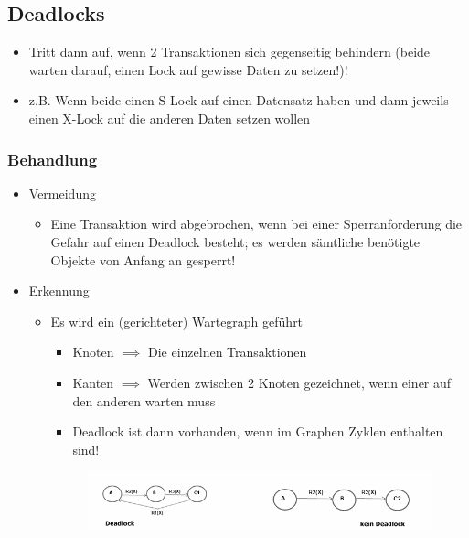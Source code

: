 \subsection{Deadlocks}
\begin{itemize}
    \item Tritt dann auf, wenn 2 Transaktionen sich gegenseitig behindern (beide warten darauf, einen Lock auf gewisse Daten zu setzen!)!
    \item z.B. Wenn beide einen S-Lock auf einen Datensatz haben und dann jeweils einen X-Lock auf die anderen Daten setzen wollen
\end{itemize}
\subsubsection{Behandlung}
\begin{itemize}
    \item Vermeidung
    \begin{itemize}
        \item Eine Transaktion wird abgebrochen, wenn bei einer Sperranforderung die Gefahr auf einen Deadlock besteht; es werden sämtliche benötigte Objekte von Anfang an gesperrt!
    \end{itemize}
    \item Erkennung
    \begin{itemize}
        \item Es wird ein (gerichteter) Wartegraph geführt
        \begin{itemize}
            \item Knoten $\implies$ Die einzelnen Transaktionen
            \item Kanten $\implies$ Werden zwischen 2 Knoten gezeichnet, wenn einer auf den anderen warten muss
            \item Deadlock ist dann vorhanden, wenn im Graphen Zyklen enthalten sind!
        \end{itemize}
        \begin{figure}[H]
            \centering
            \includegraphics[width=\textwidth]{res/themenkorb_5/ein_kein_deadlock.png}
        \end{figure}
    \end{itemize}
\end{itemize}

